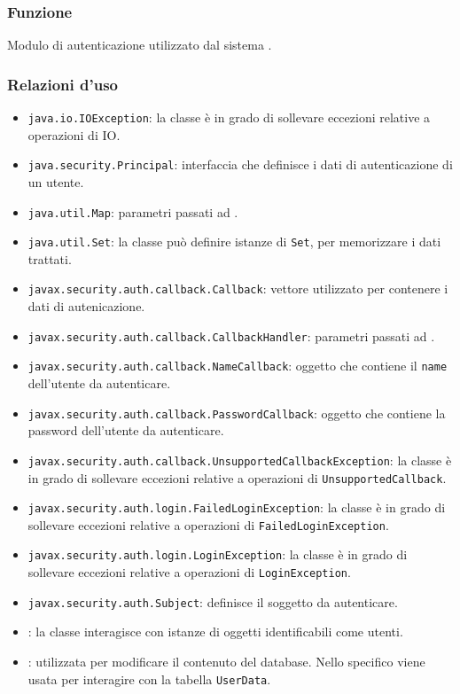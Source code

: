 
\subsubsection*{Funzione}
Modulo di autenticazione utilizzato dal sistema \caName.

\subsubsection*{Relazioni d'uso}
\begin{itemize}
	\item \texttt{java.io.IOException}: la classe è in grado di sollevare eccezioni relative a operazioni di IO.
	\item \texttt{java.security.Principal}: interfaccia che definisce i dati di autenticazione di un utente.
	\item \texttt{java.util.Map}: parametri passati ad .
	\item \texttt{java.util.Set}: la classe può definire istanze di \texttt{Set}, per memorizzare i dati trattati.
	\item \texttt{javax.security.auth.callback.Callback}: vettore utilizzato per contenere i dati di autenicazione.
	\item \texttt{javax.security.auth.callback.CallbackHandler}: parametri passati ad .
	\item \texttt{javax.security.auth.callback.NameCallback}: oggetto che contiene il \texttt{name} dell'utente da autenticare.
	\item \texttt{javax.security.auth.callback.PasswordCallback}: oggetto che contiene la password dell'utente da autenticare.
	\item \texttt{javax.security.auth.callback.UnsupportedCallbackException}: la classe è in grado di sollevare eccezioni relative a operazioni di \texttt{UnsupportedCallback}.
	\item \texttt{javax.security.auth.login.FailedLoginException}: la classe è in grado di sollevare eccezioni relative a operazioni di \texttt{FailedLoginException}.
	\item \texttt{javax.security.auth.login.LoginException}: la classe è in grado di sollevare eccezioni relative a operazioni di \texttt{LoginException}.
	\item \texttt{javax.security.auth.Subject}: definisce il soggetto da autenticare.
	\item {}: la classe interagisce con istanze di oggetti identificabili come utenti.
	\item {}: utilizzata per modificare il contenuto del database. Nello specifico viene usata per interagire con la tabella \texttt{UserData}.
\end{itemize}


